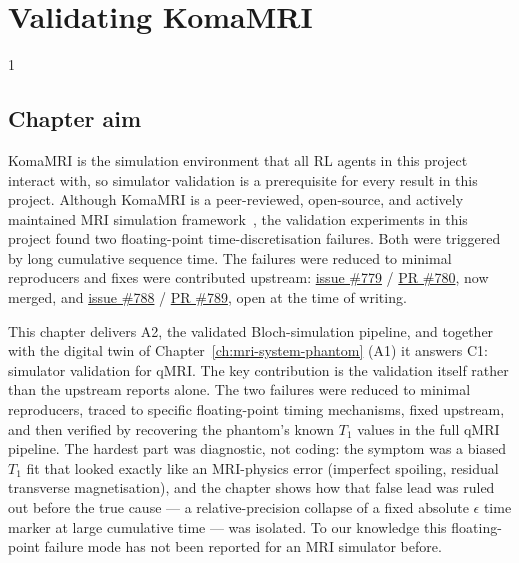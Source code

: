 \chapter[Validating KomaMRI]{Validating KomaMRI}
\label{ch:validating-komamri}


\begin{spacing}{1} %
\minitoc %
\end{spacing} %
\thesisspacing %

\setlength{\textfloatsep}{9pt plus 2pt minus 2pt}
\setlength{\floatsep}{7pt plus 2pt minus 2pt}
\setlength{\intextsep}{7pt plus 2pt minus 2pt}
\setlength{\abovecaptionskip}{3pt}
\setlength{\belowcaptionskip}{0pt}


\section{Chapter aim}
\label{sec:komamri-chapter-aim}
KomaMRI is the simulation environment that all RL agents in this project
interact with, so simulator validation is a prerequisite for every result in
this project. Although KomaMRI is a peer-reviewed, open-source, and actively
maintained MRI simulation framework~\cite{komaMRI:23}, the validation
experiments in this project found two floating-point time-discretisation
failures.
Both were triggered by long cumulative sequence time. The failures were reduced
to minimal reproducers and fixes were contributed upstream:
\href{https://github.com/JuliaHealth/KomaMRI.jl/issues/779}{issue \#779} /
\href{https://github.com/JuliaHealth/KomaMRI.jl/pull/780}{PR \#780}, now
merged, and
\href{https://github.com/JuliaHealth/KomaMRI.jl/issues/788}{issue \#788} /
\href{https://github.com/JuliaHealth/KomaMRI.jl/pull/789}{PR \#789}, open at
the time of writing.

This chapter delivers A2, the validated Bloch-simulation pipeline, and
together with the digital twin of Chapter~\ref{ch:mri-system-phantom} (A1) it
answers C1: simulator validation for qMRI. The key contribution is the
validation itself rather than the upstream reports alone. The two failures
were reduced to minimal reproducers, traced to specific floating-point timing
mechanisms, fixed upstream, and then verified by recovering the phantom's
known $T_1$ values in the full qMRI pipeline. The hardest part was
diagnostic, not coding: the symptom was a biased $T_1$ fit that looked exactly
like an MRI-physics error (imperfect spoiling, residual transverse
magnetisation), and the chapter shows how that false lead was ruled out
before the true cause --- a relative-precision collapse of a fixed absolute
$\epsilon$ time marker at large cumulative time --- was isolated. To our
knowledge this floating-point failure mode has not been reported for an MRI
simulator before.

